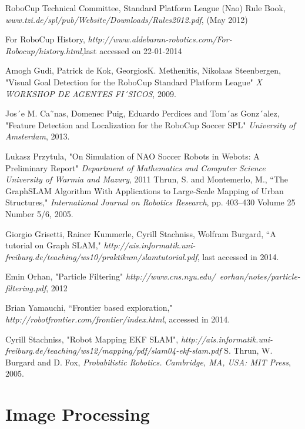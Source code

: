 \documentclass{ba-kecs}
\numberwithin{figure}{section}
\numberwithin{equation}{section}
\begin{document}
{%

\begin{thebibliography}{99}

 RoboCup Technical Committee, Standard Platform League (Nao) Rule Book, \emph{www.tzi.de/spl/pub/Website/Downloads/Rules2012.pdf}, (May 2012)

 For RoboCup History, \emph{http://www.aldebaran-robotics.com/For-Robocup/history.html},last accessed on 22-01-2014

 Amogh Gudi, Patrick de Kok, GeorgiosK. Methenitis, Nikolaas Steenbergen, "Visual Goal Detection for the RoboCup Standard Platform League" \emph{X WORKSHOP DE AGENTES FI´SICOS}, 2009.

 Jos´e M. Ca˜nas, Domenec Puig, Eduardo Perdices and Tom´as Gonz´alez, "Feature Detection and Localization for the
RoboCup Soccer SPL" \emph{University of Amsterdam}, 2013.

 Lukasz Przytula, "On Simulation of NAO Soccer Robots in Webots: A Preliminary Report" \emph{Department of Mathematics and Computer Science University of Warmia and Mazury}, 2011
 Thrun, S. and Montemerlo, M., ``The GraphSLAM Algorithm With Applications to Large-Scale Mapping of Urban Structures," \emph{International Journal on Robotics Research}, pp. 403--430 Volume 25 Number 5/6, 2005.

 Giorgio Grisetti, Rainer Kummerle, Cyrill Stachniss, Wolfram Burgard, ``A tutorial on Graph SLAM," \emph{http://ais.informatik.uni-freiburg.de/teaching/ws10/praktikum/slamtutorial.pdf}, last accessed in 2014.

 Emin Orhan, "Particle Filtering" \emph{http://www.cns.nyu.edu/~eorhan/notes/particle-filtering.pdf}, 2012
 
 Brian Yamauchi, ``Frontier based exploration," \emph{http://robotfrontier.com/frontier/index.html}, accessed in 2014. 

 Cyrill Stachniss, "Robot Mapping EKF SLAM", \emph{http://ais.informatik.uni-freiburg.de/teaching/ws12/mapping/pdf/slam04-ekf-slam.pdf }
 S. Thrun, W. Burgard and D. Fox, \emph{Probabilistic Robotics. Cambridge, MA, USA: MIT Press}, 2005.


\end{thebibliography}

\appendix
\section{Image Processing}


}
\end{document}

